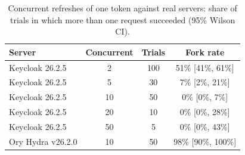 \begin{table}[htbp]
\centering
\caption{Concurrent refreshes of one token against real servers: share of trials in which more than one request succeeded (95\% Wilson CI).}
\label{tab:real-server}
\begin{tabular}{lccc}
\toprule
Server & Concurrent & Trials & Fork rate \\
\midrule
Keycloak 26.2.5 & 2 & 100 & 51\% [41\%, 61\%] \\
Keycloak 26.2.5 & 5 & 30 & 7\% [2\%, 21\%] \\
Keycloak 26.2.5 & 10 & 50 & 0\% [0\%, 7\%] \\
Keycloak 26.2.5 & 20 & 10 & 0\% [0\%, 28\%] \\
Keycloak 26.2.5 & 50 & 5 & 0\% [0\%, 43\%] \\
Ory Hydra v26.2.0 & 10 & 50 & 98\% [90\%, 100\%] \\
\bottomrule
\end{tabular}
\end{table}
